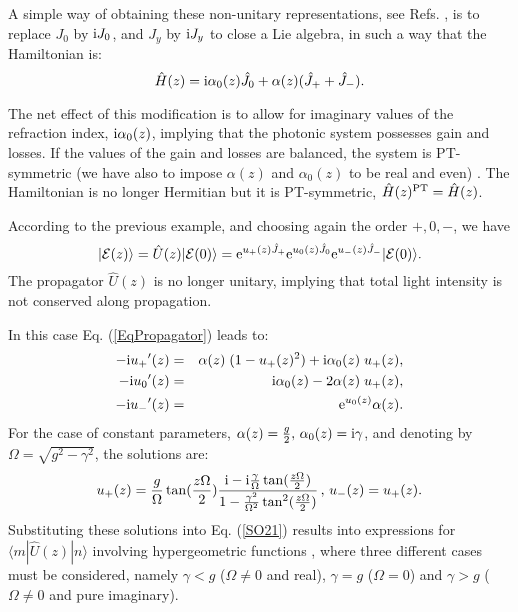 \documentclass[12pt]{iopart}
\newcommand{\bra}[1]{ \langle #1|}
\newcommand{\ket}[1]{ |#1\rangle}
\begin{document}
A simple way of obtaining these non-unitary representations, see Refs. \cite{OL,Symmetry}, is to replace $J_0$ by ${\rm i} J_0$,
and  $J_y$ by ${\rm i}J_y$ to close a Lie algebra, in such a way that the Hamiltonian is:
%
\begin{equation}
\hat{H}(z)= {\rm i} \alpha_0(z) \hat{J}_0+\alpha(z)( \hat{J}_+ +\hat{J}_-).
\end{equation}
%

The net effect of this modification is to allow for imaginary values of the refraction index, ${\rm i}\alpha_0(z)$, implying that
the photonic system possesses gain and losses. If the values of the gain and losses are  balanced, the system is PT-symmetric
(we have also
to impose $\alpha(z)$ and $\alpha_0(z)$ to be real and even) \cite{Bender1}.
The Hamiltonian is no longer Hermitian but it is PT-symmetric, $\hat{H}(z)^{\rm PT}=\hat{H}(z)$.

According to the previous example, and choosing again the order  $+,0,-$, we have
%
\begin{equation}
\ket{{\cal E}(z)}=\hat{U}(z)\ket{{\cal E}(0)}
={\rm e}^{ u_+(z)\hat{J}_+}  {\rm e}^{ u_0(z)\hat{J}_0}{\rm e}^{ u_-(z)\hat{J}_-}  \ket{{\cal
		E}(0)}.
\label{SO21}
\end{equation}
%
%
The propagator $\hat{U}(z)$ is no longer unitary, implying that total light
intensity is not conserved along propagation.


In this case Eq. (\ref{EqPropagator}) leads to:
%
\begin{eqnarray}
-{\rm i} {u_+}'(z)&=&\alpha(z)\; (1- u_+(z)^2)+{\rm i}\alpha_0(z) \; u_+(z),   \nonumber\\
-{\rm i} {u_0}'(z)&=& {\rm i}\alpha_0(z) -2  \alpha(z) \; u_+(z),  \\
-{\rm i} {u_-}'(z)&=& {\rm e}^{u_0(z)}\alpha(z) .\nonumber
\end{eqnarray}
%
For the case of
constant parameters, $\alpha(z)=\frac{g}{2},
\,\alpha_0(z)={\rm i} \gamma$, and denoting by $\Omega=\sqrt{g^2-\gamma^2}$, the solutions are:
%
\begin{equation}
u_+(z)=\frac{g}{\Omega}\tan(\frac{z \Omega}{2})\frac{{\rm i}-{\rm i}\frac{\gamma}{\Omega} \tan(\frac{z \Omega}{2})}{1-\frac{\gamma^2}{\Omega^2}\tan^2(\frac{z \Omega}{2})}\,,\,
u_-(z)=u_+(z).
\end{equation}
%
Substituting these solutions into Eq. (\ref{SO21}) results into expressions
for $\bra{m}\hat{U}(z)\ket{n}$ involving hypergeometric functions \cite{Symmetry}, where three different cases must be considered, namely
$\gamma<g$ ($\Omega\neq 0$ and real), $\gamma=g$ ($\Omega= 0$) and $\gamma>g$ ($\Omega\neq 0$ and pure imaginary).
\end{document}
